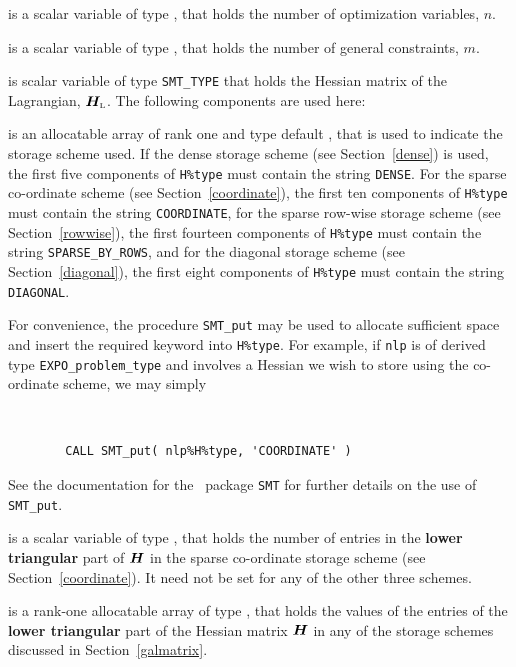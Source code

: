 \documentclass{galahad}
\newcommand{\packagename}{EXPO}
\newcommand{\bmHL}{\bmH\sub{L}}
\begin{document}
\begin{description}

 is a scalar variable of type \integer,
 that holds the number of optimization variables, $n$.

 is a scalar variable of type \integer,
 that holds the number of general constraints, $m$.

 is scalar variable of type {\tt SMT\_TYPE}
that holds the Hessian matrix of the Lagrangian, $\bmHL$. 
The following components are used here:

\begin{description}

 is an allocatable array of rank one and type default
\character, that
is used to indicate the storage scheme used. If the dense storage scheme
(see Section~\ref{dense}) is used,
the first five components of {\tt H\%type} must contain the
string {\tt DENSE}.
For the sparse co-ordinate scheme (see Section~\ref{coordinate}),
the first ten components of {\tt H\%type} must contain the
string {\tt COORDINATE},
for the sparse row-wise storage scheme (see Section~\ref{rowwise}),
the first fourteen components of {\tt H\%type} must contain the
string {\tt SPARSE\_BY\_ROWS},
and for the diagonal storage scheme (see Section~\ref{diagonal}),
the first eight components of {\tt H\%type} must contain the
string {\tt DIAGONAL}.

For convenience, the procedure {\tt SMT\_put}
may be used to allocate sufficient space and insert the required keyword
into {\tt H\%type}.
For example, if {\tt nlp} is of derived type {\tt \packagename\_problem\_type}
and involves a Hessian we wish to store using the co-ordinate scheme,
we may simply
{\tt
\begin{verbatim}
        CALL SMT_put( nlp%H%type, 'COORDINATE' )
\end{verbatim}
}
\noindent
See the documentation for the \galahad\ package {\tt SMT}
for further details on the use of {\tt SMT\_put}.

 is a scalar variable of type \integer, that
holds the number of entries in the {\bf lower triangular} part of ${\bm{H}}$
in the sparse co-ordinate storage scheme (see Section~\ref{coordinate}).
It need not be set for any of the other three schemes.

 is a rank-one allocatable array of type \realdp, that holds
the values of the entries of the {\bf lower triangular} part
of the Hessian matrix ${\bm{H}}$ in any of the
storage schemes discussed in Section~\ref{galmatrix}.


\end{description}
\end{description}
\end{document}

